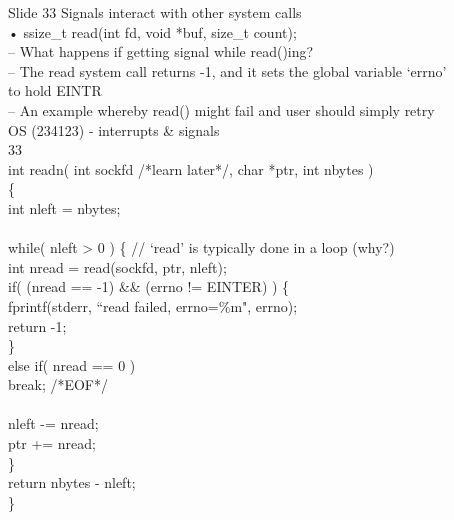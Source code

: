 \documentclass{beamer}
\begin{document}
\begin{frame}{Slide 33}
Signals interact with other system calls\\• ssize\_t read(int fd, void *buf, size\_t count);\\– What happens if getting signal while read()ing?\\– The read system call returns -1, and it sets the global variable ‘errno’ \\to hold EINTR\\– An example whereby read() might fail and user should simply retry\\OS (234123) - interrupts \& signals\\33\\int readn( int sockfd /*learn later*/, char *ptr, int nbytes )\\\{\\  int nleft = nbytes;\\    \\  while( nleft > 0 ) \{ // ‘read’ is typically done in a loop (why?)\\      int nread = read(sockfd, ptr, nleft);\\      if( (nread == -1) \&\& (errno != EINTER) ) \{\\          fprintf(stderr, “read failed, errno=\%m", errno);\\          return -1;\\      \}\\      else if( nread == 0 )\\         break; /*EOF*/\\        \\      nleft -= nread;\\      ptr   += nread;\\  \}\\  return nbytes - nleft;\\\}
\end{frame}
\end{document}
